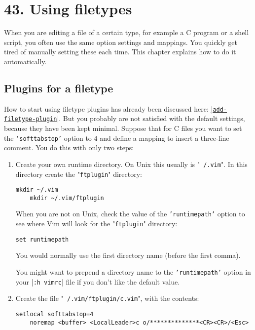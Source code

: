 \section{43. Using filetypes}
When you are editing a file of a certain type, for example a C program or a shell script, you often use the same option settings and mappings.
You quickly get tired of manually setting these each time.
This chapter explains how to do it automatically.
\localtableofcontents
\subsection{Plugins for a filetype}            
\label{filetype-plugin}
How to start using filetype plugins has already been discussed here: \hyperref[add-filetype-plugin]{|\texttt{add-filetype-plugin}|}.
But you probably are not satisfied with the default settings, because they have been kept minimal.
Suppose that for C files you want to set the \texttt{'softtabstop'} option to 4 and define a mapping to insert a three-line comment.
You do this with only two steps:

\label{your-runtime-dir}
\begin{enumerate}
				\item Create your own runtime directory.
								On Unix this usually is "\texttt{~/.vim}".
								In this directory create the "\texttt{ftplugin}" directory:

								\begin{Verbatim}[samepage=true]
	mkdir ~/.vim
	mkdir ~/.vim/ftplugin
								\end{Verbatim}


								When you are not on Unix, check the value of the \texttt{'runtimepath'} option to see where Vim will look for the "\texttt{ftplugin}" directory:

								\begin{Verbatim}[samepage=true]
 set runtimepath
								\end{Verbatim}

								You would normally use the first directory name (before the first comma).

								You might want to prepend a directory name to the \texttt{'runtimepath'} option in your |\texttt{:h vimrc}| file if you don't like the default value.

				\item Create the file "\texttt{~/.vim/ftplugin/c.vim}", with the contents:
								\begin{Verbatim}[samepage=true]
	setlocal softtabstop=4
	noremap <buffer> <LocalLeader>c o/**************<CR><CR>/<Esc>
								\end{Verbatim}
\end{enumerate}

